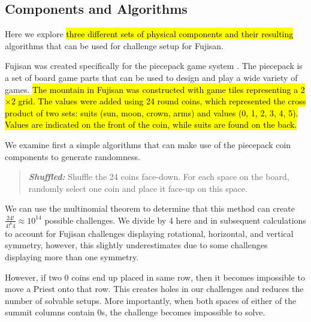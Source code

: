 \documentclass[journal]{IEEEtran}
\begin{document}


\subsection{Components and Algorithms}
\label{section:pcgalgs}
\noindent
Here we explore \hl{three different sets of physical components and their resulting} algorithms that can be used for challenge setup for Fujisan. 

Fujisan was created specifically for the piecepack game system \cite{GAMESYSTEM}. The piecepack is a set of board game parts that can be used to design and play a wide variety of games. \hl{The mountain in Fujisan was constructed with game tiles representing a 2$\times$2 grid. The values were added using 24 round coins, which represented the cross product of two sets: suits (sun, moon, crown, arms) and values (0, 1, 2, 3, 4, 5). Values are indicated on the front of the coin, while suits are found on the back.}

We examine first a simple algorithms that can make use of the piecepack coin components to generate randomness. 

\begin{quote}
    
  {\it \bf Shuffled:} Shuffle the 24 coins face-down. For each space on the board, randomly select one coin and place it face-up on this space.
  
\end{quote}

We can use the multinomial theorem to determine that this method can create
$\frac{24!}{4!^{6}4} \approx 10^{14}$ possible challenges.  We divide by 4 here and in subsequent calculations to account for Fujisan challenges displaying rotational, horizontal, and vertical symmetry, however, this slightly underestimates due to some challenges displaying more than one symmetry.

However, if two 0 coins end up placed in same row, then it becomes impossible to move a Priest onto that row. This creates holes in our challenges and reduces the number of solvable setups. 
More importantly, when both spaces of either of the summit columns contain 0s, the challenge becomes impossible to solve.
\end{document}
